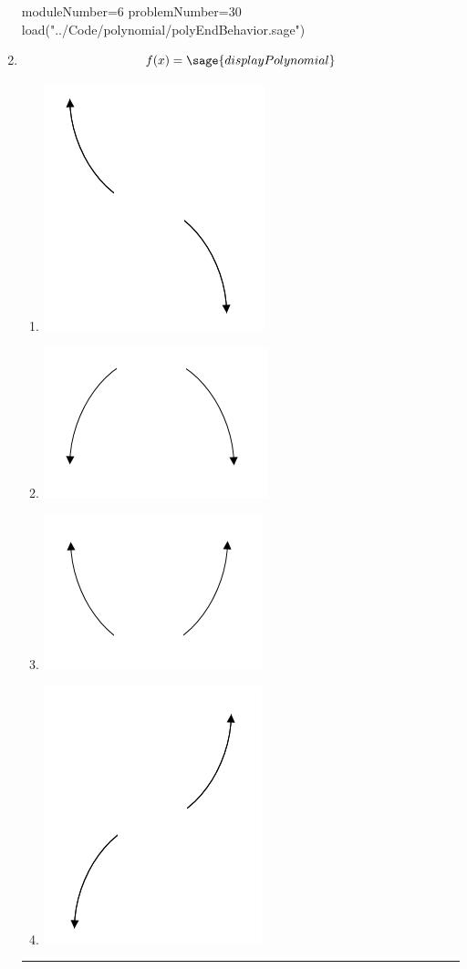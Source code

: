 \documentclass[14pt]{article}
\newcommand{\litem}[1]{\item#1\hspace*{-1cm}\rule{\textwidth}{0.4pt}}
\begin{document}
\begin{enumerate}
\begin{sagesilent}
moduleNumber=6
problemNumber=30
load("../Code/polynomial/polyEndBehavior.sage")
\end{sagesilent}

\litem{ 

	\[ f(x) = \sage{displayPolynomial} \]

\begin{multicols}{4}
	\begin{enumerate}[label=\Alph*.]
		\item \begin{center} \includegraphics[width=.2\textwidth]{../Figures/endBehaviorNegativeOddA} \end{center}
    \columnbreak
		\item \begin{center} \includegraphics[width=.2\textwidth]{../Figures/endBehaviorNegativeEvenA}\end{center}
    \columnbreak
		\item \begin{center} \includegraphics[width=.2\textwidth]{../Figures/endBehaviorPositiveEvenA}\end{center}
    \columnbreak
		\item \begin{center} \includegraphics[width=.2\textwidth]{../Figures/endBehaviorPositiveOddA}\end{center}
	\end{enumerate}
\end{multicols}
}

\end{enumerate}
\end{document}
